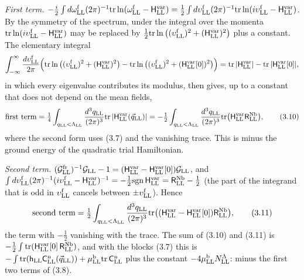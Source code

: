 \documentclass[
  10pt,
]{article}
\begin{document}
\emph{First term.}
\(-\tfrac i2\int d\omega^{\rm f}_{\rm LL}(2\pi)^{-1}\mathrm{tr}\ln(\omega^{\rm f}_{\rm LL}-\mathsf H^{\rm var}_{\rm LL}) =\tfrac12\int d\upsilon^{\rm f}_{\rm LL}(2\pi)^{-1}\mathrm{tr}\ln(i\upsilon^{\rm f}_{\rm LL}-\mathsf H^{\rm var}_{\rm LL})\).
By the symmetry of the spectrum, under the integral over the momenta
\(\mathrm{tr}\ln(i\upsilon^{\rm f}_{\rm LL}-\mathsf H^{\rm var}_{\rm LL})\)
may be replaced by
\(\tfrac12\mathrm{tr}\ln\big((\upsilon^{\rm f}_{\rm LL})^2+(\mathsf H^{\rm var}_{\rm LL})^2\big)\)
plus a constant. The elementary integral
\[\int_{-\infty}^{\infty}\frac{d\upsilon^{\rm f}_{\rm LL}}{2\pi}\Big(\mathrm{tr}\ln\big((\upsilon^{\rm f}_{\rm LL})^2+(\mathsf H^{\rm var}_{\rm LL})^2\big)-\mathrm{tr}\ln\big((\upsilon^{\rm f}_{\rm LL})^2+(\mathsf H^{\rm var}_{\rm LL}[0])^2\big)\Big)
=\mathrm{tr}\,\lvert\mathsf H^{\rm var}_{\rm LL}\rvert-\mathrm{tr}\,\lvert\mathsf H^{\rm var}_{\rm LL}[0]\rvert,\]
in which every eigenvalue contributes its modulus, then gives, up to a
constant that does not depend on the mean fields,
\[\text{first term}=\tfrac14\int_{q_{\rm LL}<\Lambda_{\rm LL}}\frac{d^3q_{\rm LL}}{(2\pi)^3}\mathrm{tr}\,\lvert\mathsf H^{\rm var}_{\rm LL}(\vec q_{\rm LL})\rvert
=-\tfrac12\int_{q_{\rm LL}<\Lambda_{\rm LL}}\frac{d^3q_{\rm LL}}{(2\pi)^3}\mathrm{tr}\big(\mathsf H^{\rm var}_{\rm LL}\mathsf R^{\rm Nb}_{\rm LL}\big),\tag{3.10}\]
where the second form uses (3.7) and the vanishing trace. This is minus
the ground energy of the quadratic trial Hamiltonian.

\emph{Second term.}
\((\mathcal G^{\rm fr}_{\rm LL})^{-1}\mathcal G_{\rm LL}-1=(\mathsf H^{\rm var}_{\rm LL}-\mathsf H^{\rm var}_{\rm LL}[0])\mathcal G_{\rm LL}\),
and
\(\int d\upsilon^{\rm f}_{\rm LL}(2\pi)^{-1}(i\upsilon^{\rm f}_{\rm LL}-\mathsf H^{\rm var}_{\rm LL})^{-1}=-\tfrac12\mathrm{sgn}\,\mathsf H^{\rm var}_{\rm LL}=\mathsf R^{\rm Nb}_{\rm LL}-\tfrac12\)
(the part of the integrand that is odd in \(\upsilon^{\rm f}_{\rm LL}\)
cancels between \(\pm\upsilon^{\rm f}_{\rm LL}\)). Hence
\[\text{second term}=\tfrac12\int_{q_{\rm LL}<\Lambda_{\rm LL}}\frac{d^3q_{\rm LL}}{(2\pi)^3}\mathrm{tr}\big((\mathsf H^{\rm var}_{\rm LL}-\mathsf H^{\rm var}_{\rm LL}[0])\mathsf R^{\rm Nb}_{\rm LL}\big),\tag{3.11}\]
the term with \(-\tfrac12\) vanishing with the trace. The sum of (3.10)
and (3.11) is
\(-\tfrac12\int\mathrm{tr}(\mathsf H^{\rm var}_{\rm LL}[0]\,\mathsf R^{\rm Nb}_{\rm LL})\),
and with the blocks (3.7) this is
\(-\int\mathrm{tr}(\mathsf h_{\rm LL}\mathsf C^{\rm n}_{\rm LL}(\vec q_{\rm LL}))+\mu^{\rm b}_{\rm LL}\mathrm{tr}\,\mathsf C^{\rm n}_{\rm LL}\)
plus the constant \(-4\mu^{\rm b}_{\rm LL}N^\Lambda_{\rm LL}\): minus
the first two terms of (3.8).
\end{document}
